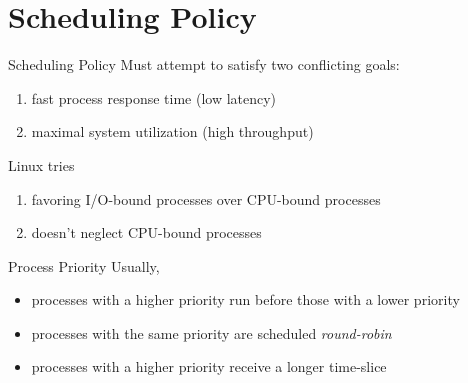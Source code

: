 \section{Scheduling Policy}
\label{sec:scheduling-policy}

\begin{frame}{Scheduling Policy}
  Must attempt to satisfy two conflicting goals:
  \begin{enumerate}
  \item fast process response time (low latency)
  \item maximal system utilization (high throughput)
  \end{enumerate}
  \vspace{1em}
  
  Linux tries
  \begin{enumerate}
  \item favoring I/O-bound processes over CPU-bound processes
  \item doesn't neglect CPU-bound processes
  \end{enumerate}
\end{frame}

\begin{frame}{Process Priority}
  Usually,
  \begin{itemize}
  \item processes with a higher priority run before those with a lower priority
  \item processes with the same priority are scheduled \emph{round-robin}
  \item processes with a higher priority receive a longer time-slice
  \end{itemize}
\end{frame}

